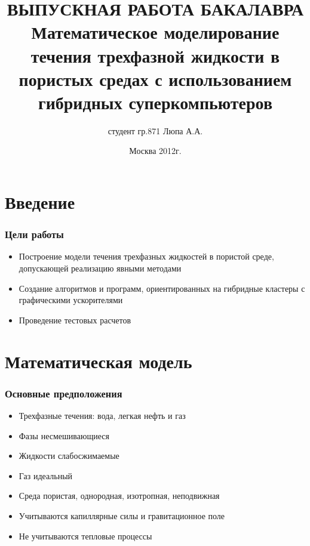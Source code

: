 \documentclass[10pt,pdf,hyperref={unicode}]{beamer} %
\title{ВЫПУСКНАЯ РАБОТА БАКАЛАВРА\\
\vspace{0.1cm}
Математическое моделирование течения трехфазной жидкости в пористых средах с использованием гибридных суперкомпьютеров}
\author{студент гр.871 Люпа А.А.}
\institute{Московский физико-технический институт \\
(государственный университет)\\
Факультет управления и прикладной математики \\
Кафедра математического моделирования \\
    \vspace{0.2cm}
    Научный руководитель:  к.ф.-м.н. Чурбанова Н.Г.\\
}
\date{
    Москва 2012г.
}
\begin{document}
\begin{frame}
  \maketitle
\end{frame}

 \section{Введение}

\begin{frame}
\begin{center}
\frametitle{Цели работы}
\begin{itemize}
\item {\large Построение модели течения трехфазных жидкостей в пористой среде, допускающей реализацию явными методами\\}
\vspace{0.5cm}
\item {\large Создание алгоритмов и программ, ориентированных на гибридные кластеры с графическими ускорителями\\}
\vspace{0.5cm}
\item {\large Проведение тестовых расчетов}
\end{itemize}
\end{center}
\end{frame}

 \section{Математическая модель}

\begin{frame}
\begin{center}
\frametitle{Основные предположения}
\begin{itemize}
\item Трехфазные течения: вода, легкая нефть и газ
\vspace{0.3cm}
\item Фазы несмешивающиеся
\vspace{0.3cm}
\item Жидкости слабосжимаемые
\vspace{0.3cm}
\item Газ идеальный
\vspace{0.3cm}
\item Среда пористая, однородная, изотропная, неподвижная
\vspace{0.3cm}
\item Учитываются капиллярные силы и гравитационное поле
\vspace{0.3cm}
\item Не учитываются тепловые процессы
\end{itemize}
\end{center}
\end{frame}
\end{document}
